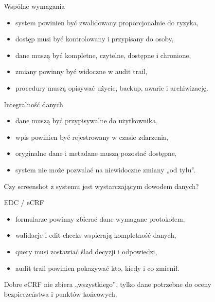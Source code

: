 \begin{frame}{Wspólne wymagania}
  \begin{itemize}
    \item system powinien być zwalidowany proporcjonalnie do ryzyka,
    \item dostęp musi być kontrolowany i przypisany do osoby,
    \item dane muszą być kompletne, czytelne, dostępne i chronione,
    \item zmiany powinny być widoczne w audit trail,
    \item procedury muszą opisywać użycie, backup, awarie i archiwizację.
  \end{itemize}
\end{frame}

\begin{frame}{Integralność danych}
  \begin{itemize}
    \item dane muszą być przypisywalne do użytkownika,
    \item wpis powinien być rejestrowany w czasie zdarzenia,
    \item oryginalne dane i metadane muszą pozostać dostępne,
    \item system nie może pozwalać na niewidoczne zmiany „od tyłu”.
  \end{itemize}

  \vspace{0.3cm}

  \begin{QuestionBox}
    Czy screenshot z systemu jest wystarczającym dowodem danych?
  \end{QuestionBox}
\end{frame}

\begin{frame}{EDC / eCRF}
  \begin{itemize}
    \item formularze powinny zbierać dane wymagane protokołem,
    \item walidacje i edit checks wspierają kompletność danych,
    \item query musi zostawiać ślad decyzji i odpowiedzi,
    \item audit trail powinien pokazywać kto, kiedy i co zmienił.
  \end{itemize}

  \vspace{0.3cm}

  \begin{ExampleBox}
    Dobre eCRF nie zbiera „wszystkiego”, tylko dane potrzebne do oceny bezpieczeństwa i punktów końcowych.
  \end{ExampleBox}
\end{frame}

